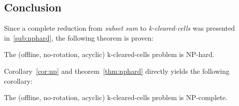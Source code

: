 \subsection{Conclusion}

Since a complete reduction from \textit{subset sum} to \textit{k-cleared-cells} was presented in~\ref{sub:nphard}, the following theorem is proven: \\

\begin{thm}
\label{thm:nphard}
The (offline, no-rotation, acyclic) k-cleared-cells problem is NP-hard.
\end{thm}

\smallbreak

Corollary~\ref{cor:np} and theorem~\ref{thm:nphard} directly yields the following corollary: \\

\begin{cor}
The (offline, no-rotation, acyclic) k-cleared-cells problem is NP-complete.
\end{cor}
